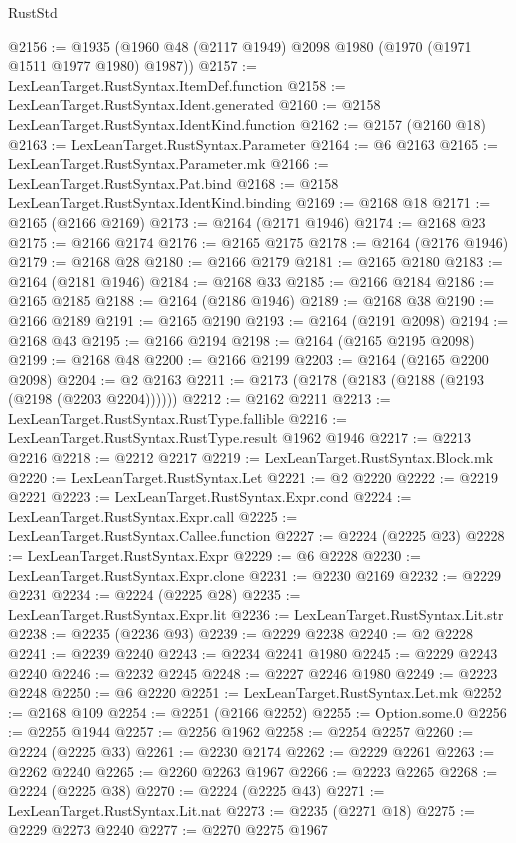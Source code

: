\begin{lexlean}{RustStd}
\begin{coremodule}
{\begin{coremodule}
{{{{{{{{{{{{{{{{{{{{{{{{{{{{{{{{{{{{{{{{{{{{{{{{{{{{{@2156 := @1935 (@1960 @48 (@2117 @1949) @2098 @1980 (@1970 (@1971 @1511 @1977 @1980) @1987))
@2157 := LexLeanTarget.RustSyntax.ItemDef.function
@2158 := LexLeanTarget.RustSyntax.Ident.generated
@2160 := @2158 LexLeanTarget.RustSyntax.IdentKind.function
@2162 := @2157 (@2160 @18)
@2163 := LexLeanTarget.RustSyntax.Parameter
@2164 := @6 @2163
@2165 := LexLeanTarget.RustSyntax.Parameter.mk
@2166 := LexLeanTarget.RustSyntax.Pat.bind
@2168 := @2158 LexLeanTarget.RustSyntax.IdentKind.binding
@2169 := @2168 @18
@2171 := @2165 (@2166 @2169)
@2173 := @2164 (@2171 @1946)
@2174 := @2168 @23
@2175 := @2166 @2174
@2176 := @2165 @2175
@2178 := @2164 (@2176 @1946)
@2179 := @2168 @28
@2180 := @2166 @2179
@2181 := @2165 @2180
@2183 := @2164 (@2181 @1946)
@2184 := @2168 @33
@2185 := @2166 @2184
@2186 := @2165 @2185
@2188 := @2164 (@2186 @1946)
@2189 := @2168 @38
@2190 := @2166 @2189
@2191 := @2165 @2190
@2193 := @2164 (@2191 @2098)
@2194 := @2168 @43
@2195 := @2166 @2194
@2198 := @2164 (@2165 @2195 @2098)
@2199 := @2168 @48
@2200 := @2166 @2199
@2203 := @2164 (@2165 @2200 @2098)
@2204 := @2 @2163
@2211 := @2173 (@2178 (@2183 (@2188 (@2193 (@2198 (@2203 @2204))))))
@2212 := @2162 @2211
@2213 := LexLeanTarget.RustSyntax.RustType.fallible
@2216 := LexLeanTarget.RustSyntax.RustType.result @1962 @1946
@2217 := @2213 @2216
@2218 := @2212 @2217
@2219 := LexLeanTarget.RustSyntax.Block.mk
@2220 := LexLeanTarget.RustSyntax.Let
@2221 := @2 @2220
@2222 := @2219 @2221
@2223 := LexLeanTarget.RustSyntax.Expr.cond
@2224 := LexLeanTarget.RustSyntax.Expr.call
@2225 := LexLeanTarget.RustSyntax.Callee.function
@2227 := @2224 (@2225 @23)
@2228 := LexLeanTarget.RustSyntax.Expr
@2229 := @6 @2228
@2230 := LexLeanTarget.RustSyntax.Expr.clone
@2231 := @2230 @2169
@2232 := @2229 @2231
@2234 := @2224 (@2225 @28)
@2235 := LexLeanTarget.RustSyntax.Expr.lit
@2236 := LexLeanTarget.RustSyntax.Lit.str
@2238 := @2235 (@2236 @93)
@2239 := @2229 @2238
@2240 := @2 @2228
@2241 := @2239 @2240
@2243 := @2234 @2241 @1980
@2245 := @2229 @2243 @2240
@2246 := @2232 @2245
@2248 := @2227 @2246 @1980
@2249 := @2223 @2248
@2250 := @6 @2220
@2251 := LexLeanTarget.RustSyntax.Let.mk
@2252 := @2168 @109
@2254 := @2251 (@2166 @2252)
@2255 := Option.some.{0}
@2256 := @2255 @1944
@2257 := @2256 @1962
@2258 := @2254 @2257
@2260 := @2224 (@2225 @33)
@2261 := @2230 @2174
@2262 := @2229 @2261
@2263 := @2262 @2240
@2265 := @2260 @2263 @1967
@2266 := @2223 @2265
@2268 := @2224 (@2225 @38)
@2270 := @2224 (@2225 @43)
@2271 := LexLeanTarget.RustSyntax.Lit.nat
@2273 := @2235 (@2271 @18)
@2275 := @2229 @2273 @2240
@2277 := @2270 @2275 @1967
}}}}}}}}}}}}}}}}}}}}}}}}}}}}}}}}}}}}}}}}}}}}}}}}}}}}}
\end{coremodule}}
\end{coremodule}
\end{lexlean}
